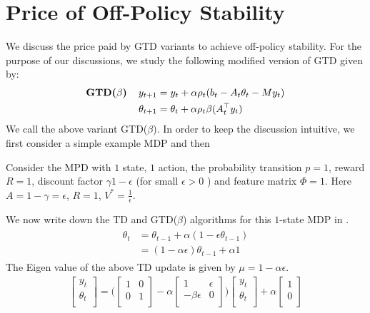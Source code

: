 \section{Price of Off-Policy Stability}
We discuss the price paid by GTD variants to achieve off-policy stability.
For the purpose of our discussions, we study the following modified version of GTD given by:
\begin{align}\label{gtdbeta}
\begin{split}
\textbf{GTD($\beta$)\quad}y_{t+1}&=y_t+\alpha \rho_t(b_t-A_t\theta_t - M y_t)\\
\theta_{t+1}&=\theta_t+\alpha\rho_t\beta(A^\top_ty_t)
\end{split}
\end{align}
We call the above variant GTD($\beta$).
In order to keep the discussion intuitive, we first consider a simple example MDP and then
\begin{example}\label{onestatemdp}
Consider the MPD with $1$ state, $1$ action, the probability transition $p=1$, reward $R=1$, discount factor $\gamma 1-\epsilon$ (for small $\epsilon>0$ ) and feature matrix $\Phi=1$. Here $A=1-\gamma=\epsilon$, $R=1$, $V^*=\frac{1}{\epsilon}$.
\end{example}
We now write down the TD and GTD($\beta$) algorithms for this $1$-state MDP in .
\begin{align}\label{tdonestate}
\begin{split}
\theta_{t}&=\theta_{t-1}+\alpha(1-\epsilon\theta_{t-1})\\
&=(1-\alpha\epsilon)\theta_{t-1}+\alpha 1
\end{split}
\end{align}
The Eigen value of the above TD update is given by $\mu=1-\alpha\epsilon$.
\begin{align}\label{gtdonestate}
\begin{bmatrix} y_t \\ \theta_t\\\end{bmatrix}=\Big(\begin{bmatrix} 1&0 \\ 0& 1\\\end{bmatrix} - \alpha\begin{bmatrix} 1&\epsilon \\ -\beta\epsilon& 0\\\end{bmatrix}\Big)\begin{bmatrix} y_t \\ \theta_t\\\end{bmatrix}+\alpha\begin{bmatrix} 1 \\ 0\\\end{bmatrix}
\end{align}
